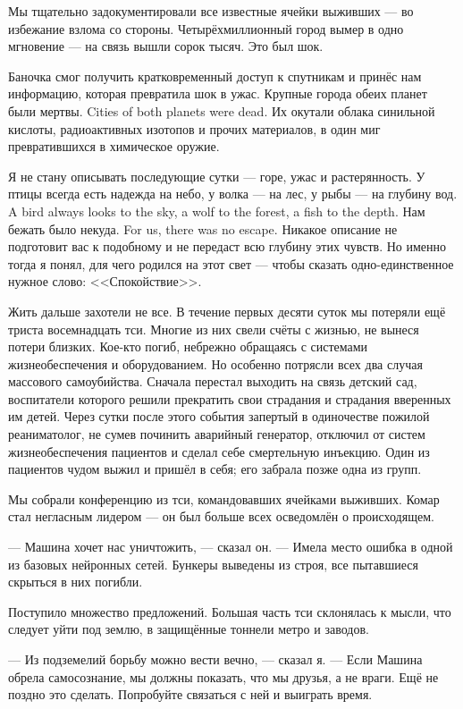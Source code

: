 Мы тщательно задокументировали все известные ячейки выживших --- во избежание взлома со стороны.
Четырёхмиллионный город вымер в одно мгновение --- на связь вышли сорок тысяч.
Это был шок.

Баночка смог получить кратковременный доступ к спутникам и принёс нам информацию, которая превратила шок в ужас.
{Крупные города обеих планет были мертвы.}
{Cities of both planets were dead.}
Их окутали облака синильной кислоты, радиоактивных изотопов и прочих материалов, в один миг превратившихся в химическое оружие.

Я не стану описывать последующие сутки --- горе, ужас и растерянность.
{У птицы всегда есть надежда на небо, у волка --- на лес, у рыбы --- на глубину вод.}
{A bird always looks to the sky, a wolf to the forest, a fish to the depth.}
{Нам бежать было некуда.}
{For us, there was no escape.}
Никакое описание не подготовит вас к подобному и не передаст всю глубину этих чувств.
Но именно тогда я понял, для чего родился на этот свет --- чтобы сказать одно-единственное нужное слово: <<Спокойствие>>.

Жить дальше захотели не все.
В течение первых десяти суток мы потеряли ещё триста восемнадцать тси.
Многие из них свели счёты с жизнью, не вынеся потери близких.
Кое-кто погиб, небрежно обращаясь с системами жизнеобеспечения и оборудованием.
Но особенно потрясли всех два случая массового самоубийства.
Сначала перестал выходить на связь детский сад, воспитатели которого решили прекратить свои страдания и страдания вверенных им детей.
Через сутки после этого события запертый в одиночестве пожилой реаниматолог, не сумев починить аварийный генератор, отключил от систем жизнеобеспечения пациентов и сделал себе смертельную инъекцию.
Один из пациентов чудом выжил и пришёл в себя;
его забрала позже одна из групп.

Мы собрали конференцию из тси, командовавших ячейками выживших.
Комар стал негласным лидером --- он был больше всех осведомлён о происходящем.

--- Машина хочет нас уничтожить, --- сказал он.
--- Имела место ошибка в одной из базовых нейронных сетей.
Бункеры выведены из строя, все пытавшиеся скрыться в них погибли.

Поступило множество предложений.
Большая часть тси склонялась к мысли, что следует уйти под землю, в защищённые тоннели метро и заводов.

--- Из подземелий борьбу можно вести вечно, --- сказал я.
--- Если Машина обрела самосознание, мы должны показать, что мы друзья, а не враги.
Ещё не поздно это сделать.
Попробуйте связаться с ней и выиграть время.

